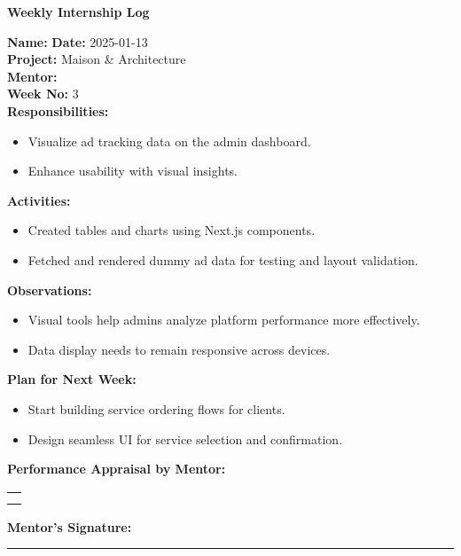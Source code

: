 \begin{center}
    \bfseries Weekly Internship Log
\end{center}

\noindent
\textbf{Name:}  \hfill \textbf{Date:} 2025-01-13 \\
\textbf{Project:} Maison \& Architecture \hfill \\
\textbf{Mentor:}  \\
\textbf{Week No:} 3 \\

\noindent
\textbf{Responsibilities:}
\begin{itemize}
    \item Visualize ad tracking data on the admin dashboard.
    \item Enhance usability with visual insights.
\end{itemize}

\noindent
\textbf{Activities:}
\begin{itemize}
    \item Created tables and charts using Next.js components.
    \item Fetched and rendered dummy ad data for testing and layout validation.
\end{itemize}

\noindent
\textbf{Observations:}
\begin{itemize}
    \item Visual tools help admins analyze platform performance more effectively.
    \item Data display needs to remain responsive across devices.
\end{itemize}

\noindent
\textbf{Plan for Next Week:}
\begin{itemize}
    \item Start building service ordering flows for clients.
    \item Design seamless UI for service selection and confirmation.
\end{itemize}

\noindent
\textbf{Performance Appraisal by Mentor:} \\
\begin{table}[h]
    \centering
    \noindent
    \begin{tabularx}{\textwidth} { 
        | >{\centering\arraybackslash}X| }

        \hline
        \\ \\
        \hline
    \end{tabularx}
\end{table}

\vspace{2em}
\noindent
\textbf{Mentor’s Signature:} \\
\rule{0.4\textwidth}{0.5pt}
